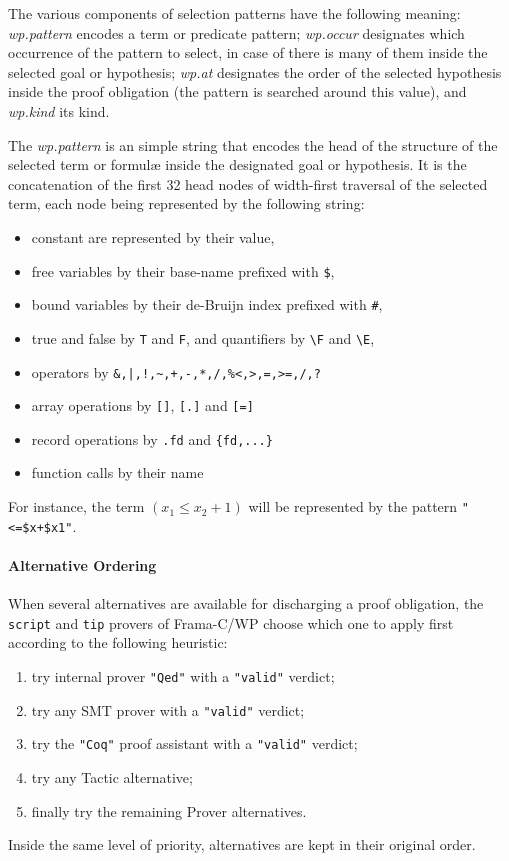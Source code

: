The various components of selection patterns have the following meaning: \textit{wp.pattern} encodes
a term or predicate pattern; \textit{wp.occur} designates which occurrence of the pattern to select,
in case of there is many of them inside the selected goal or hypothesis; \textit{wp.at} designates the
order of the selected hypothesis inside the proof obligation (the pattern is searched around this value),
and \textit{wp.kind} its kind.

The \textit{wp.pattern} is an simple string that encodes the head of the structure of the 
selected term or formulæ inside the designated goal or hypothesis. It is the concatenation of
the first 32 head nodes of width-first traversal of the selected term, each node being represented by
the following string:
\begin{itemize}
    \item constant are represented by their value,
    \item free variables by their base-name prefixed with \verb'$',
    \item bound variables by their de-Bruijn index prefixed with \verb'#',
    \item true and false by \verb"T" and \verb"F", and quantifiers by \verb"\F" and \verb"\E",
    \item operators by \verb"&,|,!,~,+,-,*,/,%<,>,=,>=,/,?"
    \item array operations by \verb"[]", \verb"[.]" and \verb"[=]"
    \item record operations by \verb".fd" and \verb"{fd,...}"
    \item function calls by their name
\end{itemize}

For instance, the term $(x_1 \leq x_2+1)$ will be represented by the pattern \verb|"<=$x+$x1"|.

\paragraph{Alternative Ordering} When several alternatives are available for
discharging a proof obligation, the \texttt{script} and \texttt{tip} provers
of \textsf{Frama-C/WP} choose which one to apply first according to the
following heuristic:
\begin{enumerate}
    \item try internal prover \texttt{"Qed"} with a \texttt{"valid"} verdict;
    \item try any SMT prover with a \texttt{"valid"} verdict;
    \item try the \texttt{"Coq"} proof assistant with a \texttt{"valid"} verdict;
    \item try any Tactic alternative;
    \item finally try the remaining Prover alternatives.
\end{enumerate}

Inside the same level of priority, alternatives are kept in their original
order.
